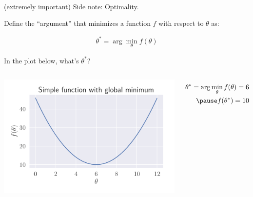 \documentclass[aspectratio=169]{beamer}
\begin{document}
\begin{frame}{(extremely important) Side note: Optimality.}


Define the ``argument'' that minimizes a function $f$ with respect to $\theta$ as:

\begin{align*}
\theta^* = \arg \min_{\theta} f(\theta)
\end{align*}

In the plot below, what's $\theta^*$?

\vspace{-8mm}

\begin{columns}
\begin{center}
\includegraphics[scale=0.5]{simple_min}
\end{center}

\pause
\begin{align*}
\theta^* = \arg \min_{\theta} f(\theta) = 6\\
\pause
f(\theta^*) =10
\end{align*}

\end{columns}

\end{frame}
\end{document}
